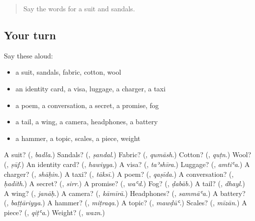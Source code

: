 \label{lesson:AR-R218-second-pass-words-from-chapters-214-218}



\begin{quote}
Say the words for a suit and sandals.
\end{quote}

\subsection*{Your turn}
Say these aloud:

\begin{itemize}
\raggedright
  \item a suit, sandals, fabric, cotton, wool
  \item an identity card, a visa, luggage, a charger, a taxi
  \item a poem, a conversation, a secret, a promise, fog
  \item a tail, a wing, a camera, headphones, a battery
  \item a hammer, a topic, scales, a piece, weight
\end{itemize}

\begin{tcolorbox}[breakable,colback=teal!4,colframe=teal!35!black,title={Before you move on}]
A suit? (\textbf{}, \emph{badla}.) Sandals? (\textbf{}, \emph{ṣandal}.) Fabric? (\textbf{}, \emph{qumāsh}.) Cotton? (\textbf{}, \emph{quṭn}.) Wool? (\textbf{}, \emph{ṣūf}.) An identity card? (\textbf{}, \emph{hawiyya}.) A visa? (\textbf{}, \emph{taʾshīra}.) Luggage? (\textbf{}, \emph{amtiʿa}.) A charger? (\textbf{}, \emph{shāḥin}.) A taxi? (\textbf{}, \emph{tāksī}.) A poem? (\textbf{}, \emph{qaṣīda}.) A conversation? (\textbf{}, \emph{ḥadīth}.) A secret? (\textbf{}, \emph{sirr}.) A promise? (\textbf{}, \emph{waʿd}.) Fog? (\textbf{}, \emph{ḍabāb}.) A tail? (\textbf{}, \emph{dhayl}.) A wing? (\textbf{}, \emph{janāḥ}.) A camera? (\textbf{}, \emph{kāmīrā}.) Headphones? (\textbf{}, \emph{sammāʿa}.) A battery? (\textbf{}, \emph{baṭṭāriyya}.) A hammer? (\textbf{}, \emph{miṭraqa}.) A topic? (\textbf{}, \emph{mawḍūʿ}.) Scales? (\textbf{}, \emph{mīzān}.) A piece? (\textbf{}, \emph{qiṭʿa}.) Weight? (\textbf{}, \emph{wazn}.)
\end{tcolorbox}
